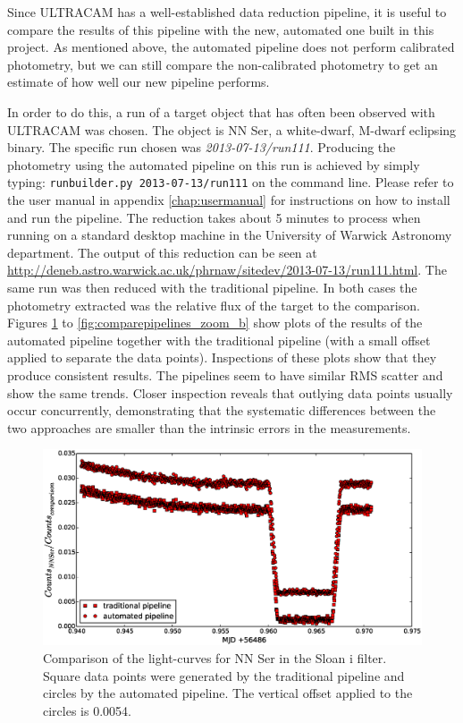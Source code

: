 Since ULTRACAM has a well-established data reduction pipeline, it is useful to compare the results of this pipeline with the new, automated one built in this project. As mentioned above, the automated pipeline does not perform calibrated photometry, but we can still compare the non-calibrated photometry to get an estimate of how well our new pipeline performs.

In order to do this, a run of a target object that has often been observed with ULTRACAM was chosen. The object is NN Ser, a white-dwarf, M-dwarf eclipsing binary. The specific run chosen was \emph{2013-07-13/run111}. Producing the photometry using the automated pipeline on this run is achieved by simply typing: \texttt{runbuilder.py 2013-07-13/run111} on the command line. Please refer to the user manual in appendix \ref{chap:usermanual} for instructions on how to install and run the pipeline.  The reduction takes about 5 minutes to process when running on a standard desktop machine in the University of Warwick Astronomy department. The output of this reduction can be seen at \url{http://deneb.astro.warwick.ac.uk/phrnaw/sitedev/2013-07-13/run111.html}. The same run was then reduced with the traditional pipeline. In both cases the photometry extracted was the relative flux of the target to the comparison. Figures \ref{fig:comparepipelines_r} to \ref{fig:comparepipelines_zoom_b} show plots of the results of the automated pipeline together with the traditional pipeline (with a small offset applied to separate the data points). Inspections of these plots show that they produce consistent results. The pipelines seem to have similar RMS scatter and show the same trends. Closer inspection reveals that outlying data points usually occur concurrently,  demonstrating that the systematic differences between the two approaches are smaller than the intrinsic errors in the measurements. 

\begin{figure}
\centering
\includegraphics[width=140mm]{images/nn_ser_compare_r.eps}
\caption{Comparison of the light-curves for NN Ser in the Sloan i filter. Square data points were generated by the traditional pipeline and circles by the automated pipeline. The vertical offset applied to the circles is 0.0054. }
\label{fig:comparepipelines_r}
\end{figure}

